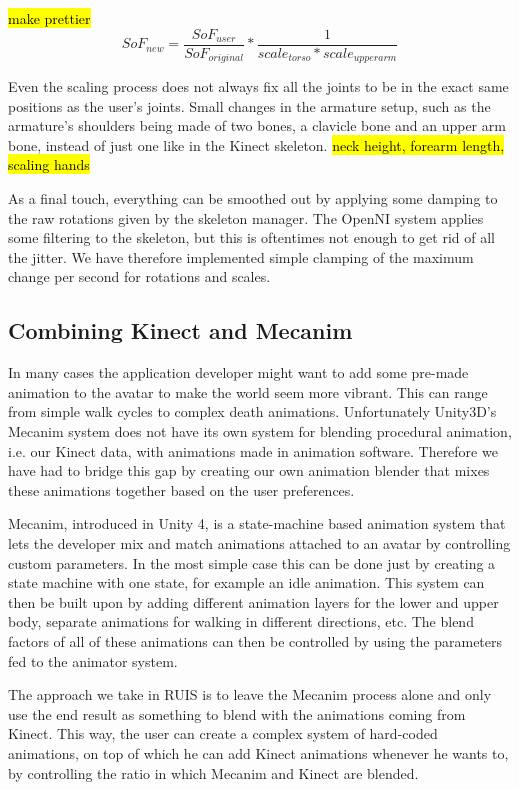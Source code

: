 \documentclass[12pt,a4paper,oneside,pdftex]{report}
\begin{document}
\hl{make prettier}
\begin{equation}
    \label{eq:forearmscale}
    SoF_{new} = \frac{SoF_{user}}{SoF_{original}} * \frac{1}{scale_{torso} * scale_{upperarm}}
\end{equation}

Even the scaling process does not always fix all the joints to be in the exact same positions as the user's joints. Small changes in the armature setup, such as the armature's shoulders being made of two bones, a clavicle bone and an upper arm bone, instead of just one like in the Kinect skeleton. \hl{neck height, forearm length, scaling hands}

As a final touch, everything can be smoothed out by applying some damping to the raw rotations given by the skeleton manager. The OpenNI system applies some filtering to the skeleton, but this is oftentimes not enough to get rid of all the jitter. We have therefore implemented simple clamping of the maximum change per second for rotations and scales.

\subsection{Combining Kinect and Mecanim}
\label{subsection:skeletontracking:kinectandmecanim}

In many cases the application developer might want to add some pre-made animation to the avatar to make the world seem more vibrant. This can range from simple walk cycles to complex death animations. Unfortunately Unity3D's Mecanim system does not have its own system for blending procedural animation, i.e. our Kinect data, with animations made in animation software. Therefore we have had to bridge this gap by creating our own animation blender that mixes these animations together based on the user preferences. 

Mecanim, introduced in Unity 4, is a state-machine based animation system that lets the developer mix and match animations attached to an avatar by controlling custom parameters. In the most simple case this can be done just by creating a state machine with one state, for example an idle animation. This system can then be built upon by adding different animation layers for the lower and upper body, separate animations for walking in different directions, etc. The blend factors of all of these animations can then be controlled by using the parameters fed to the animator system. 

The approach we take in RUIS is to leave the Mecanim process alone and only use the end result as something to blend with the animations coming from Kinect. This way, the user can create a complex system of hard-coded animations, on top of which he can add Kinect animations whenever he wants to, by controlling the ratio in which Mecanim and Kinect are blended.
\end{document}
